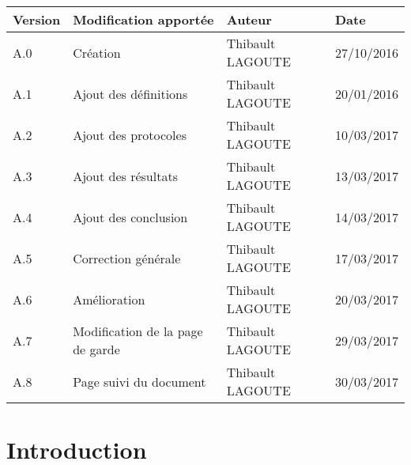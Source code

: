 \documentclass[10pt,a4paper]{article}
\begin{document}
\begin{center}
    \begin{tabular}{| l | l | l | l |}
    \hline
     \rowcolor{gray} Version & Modification apportée & Auteur & Date \\ \hline
    A.0 & Création & Thibault LAGOUTE & 27/10/2016\\ \hline
    A.1 & Ajout des définitions & Thibault LAGOUTE & 20/01/2016\\ \hline
    A.2 & Ajout des protocoles & Thibault LAGOUTE & 10/03/2017\\ \hline
    A.3 & Ajout des résultats & Thibault LAGOUTE & 13/03/2017\\ \hline
    A.4 & Ajout des conclusion & Thibault LAGOUTE & 14/03/2017\\ \hline
    A.5 & Correction générale & Thibault LAGOUTE & 17/03/2017\\ \hline
    A.6 & Amélioration & Thibault LAGOUTE & 20/03/2017\\ \hline
    A.7 & Modification de la page de garde & Thibault LAGOUTE & 29/03/2017\\ \hline
    A.8 & Page suivi du document & Thibault LAGOUTE & 30/03/2017\\ \hline
    \end{tabular}
\end{center}



\makeatletter
\def\captionof#1#2{{\def\@captype{#1}#2}}
\makeatother

\newpage
\section{Introduction}
\end{document}
